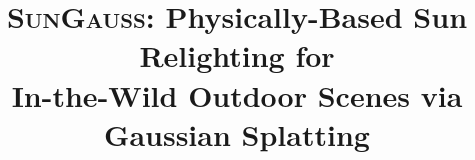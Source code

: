 \usepackage[utf8]{inputenc}
\usepackage{amsmath,amssymb,amsfonts}
\usepackage{graphicx}
\usepackage{booktabs}
\usepackage{hyperref}
\usepackage{xcolor}
\usepackage{algorithm}
\usepackage{algorithmic}
\usepackage{multirow}
\usepackage{subcaption}
\usepackage{siunitx}
\usepackage{dblfloatfix}

\setcounter{dbltopnumber}{2}
\renewcommand{\dbltopfraction}{0.95}
\renewcommand{\dblfloatpagefraction}{0.85}
\renewcommand{\textfraction}{0.05}

\newcommand{\todo}[1]{{\color{red}\textbf{[TODO:~#1]}}}
\newcommand{\ours}{\textsc{SunGauss}}
\def\eg{\emph{e.g}\bmvaOneDot}
\def\Eg{\emph{E.g}\bmvaOneDot}
\def\etal{\emph{et al}\bmvaOneDot}

\title{\ours{}: Physically-Based Sun Relighting for\\In-the-Wild Outdoor Scenes via Gaussian Splatting}


